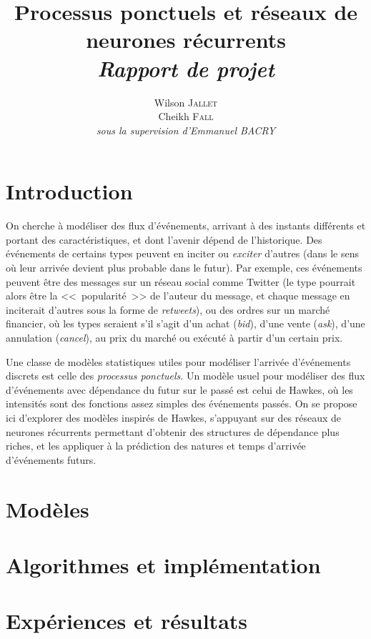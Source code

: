\documentclass[11pt]{article}
\title{\textbf{Processus ponctuels et réseaux de neurones récurrents}\\
	\textit{Rapport de projet}  
}
\author{
  Wilson \textsc{Jallet}\\
  Cheikh \textsc{Fall}\\
  \textit{sous la supervision d'Emmanuel BACRY}
}
\begin{document}
\maketitle

\section{Introduction}

On cherche à modéliser des flux d'événements, arrivant à des instants différents et portant des caractéristiques, et dont l'avenir dépend de l'historique. Des événements de certains types peuvent en inciter ou \textit{exciter} d'autres (dans le sens où leur arrivée devient plus probable dans le futur). Par exemple, ces événements peuvent être des messages sur un réseau social comme Twitter (le type pourrait alors être la <<~popularité~>> de l'auteur du message, et chaque message en inciterait d'autres sous la forme de \textit{retweets}), ou des ordres sur un marché financier, où les types seraient s'il s'agit d'un achat (\textit{bid}), d'une vente (\textit{ask}), d'une annulation (\textit{cancel}), au prix du marché ou exécuté à partir d'un certain prix.

Une classe de modèles statistiques utiles pour modéliser l'arrivée d'événements discrets est celle des \textit{processus ponctuels}. Un modèle usuel pour modéliser des flux d'événements avec dépendance du futur sur le passé est celui de Hawkes, où les intensités sont des fonctions assez simples des événements passés. On se propose ici d'explorer des modèles inspirés de Hawkes, s'appuyant sur des réseaux de neurones récurrents permettant d'obtenir des structures de dépendance plus riches, et les appliquer à la prédiction des natures et temps d'arrivée d'événements futurs.

\section{Modèles}




\section{Algorithmes et implémentation}



\section{Expériences et résultats}




\printbibliography

\begin{appendices}
	


\end{appendices}
\end{document}
